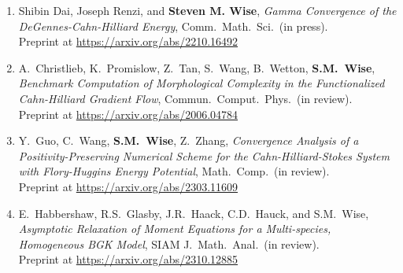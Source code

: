 \documentclass[11pt]{letter}
\begin{document}
\begin{enumerate}
	\item
Shibin Dai, Joseph Renzi, and \textbf{Steven M. Wise}, {\sl Gamma Convergence of the DeGennes-Cahn-Hilliard Energy}, Comm.~Math.~Sci.~(in press). 
	\\
Preprint at \url{https://arxiv.org/abs/2210.16492}

	\item
A.~Christlieb, K.~Promislow, Z.~Tan, S.~Wang, B.~Wetton, \textbf{S.M.~Wise}, {\sl Benchmark Computation of Morphological Complexity in the Functionalized Cahn-Hilliard Gradient Flow}, Commun.~Comput.~Phys.~(in review).
	\\ 
Preprint at \url{https://arxiv.org/abs/2006.04784}

	\item
Y.~Guo, C.~Wang, \textbf{S.M.~Wise}, Z.~Zhang, {\sl Convergence Analysis of a Positivity-Preserving Numerical Scheme for the Cahn-Hilliard-Stokes System with Flory-Huggins Energy Potential}, Math.~Comp.~(in review).
	\\
Preprint at \url{https://arxiv.org/abs/2303.11609}

	\item
E.~Habbershaw, R.S.~Glasby, J.R.~Haack, C.D.~Hauck, and S.M.~Wise, {\sl Asymptotic Relaxation of Moment Equations for a Multi-species, Homogeneous BGK Model}, SIAM J.~Math.~Anal.~(in review).
	\\
Preprint at \url{https://arxiv.org/abs/2310.12885}


	\end{enumerate}
\end{document}
